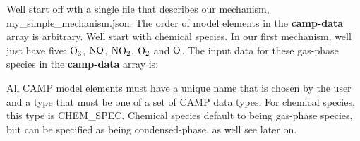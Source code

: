 We\textquotesingle{}ll start off wth a single file that describes our mechanism, {\ttfamily my\+\_\+simple\+\_\+mechanism.\+json}. The order of model elements in the {\bfseries{camp-\/data}} array is arbitrary. We\textquotesingle{}ll start with chemical species. In our first mechanism, we\textquotesingle{}ll just have five\+: $\ce{O3}$, $\ce{NO}$, $\ce{NO2}$, $\ce{O2}$ and $\ce{O}$. The input data for these gas-\/phase species in the {\bfseries{camp-\/data}} array is\+: 
\begin{DoxyCode}{0}
\DoxyCodeLine{\{}
\DoxyCodeLine{\},}
\DoxyCodeLine{\{}
\DoxyCodeLine{\},}
\DoxyCodeLine{\{}
\DoxyCodeLine{\},}
\DoxyCodeLine{\{}
\DoxyCodeLine{\},}
\DoxyCodeLine{\{}
\DoxyCodeLine{\},}

\end{DoxyCode}
 All CAMP model elements must have a unique name that is chosen by the user and a type that must be one of a set of CAMP data types. For chemical species, this type is {\ttfamily CHEM\+\_\+\+SPEC}. Chemical species default to being gas-\/phase species, but can be specified as being condensed-\/phase, as we\textquotesingle{}ll see later on.


